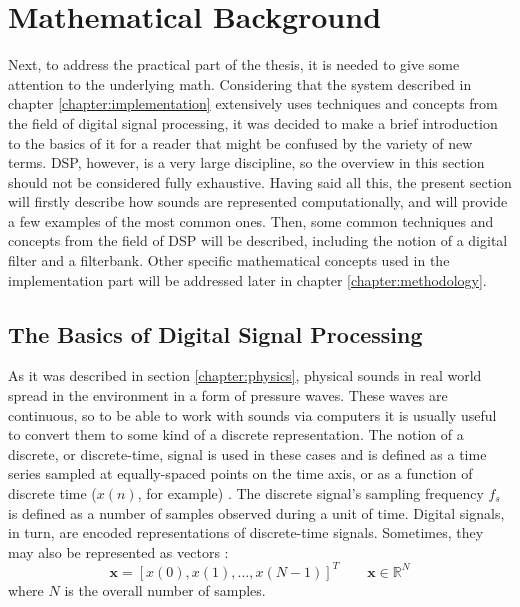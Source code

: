 \section{Mathematical Background}\label{chapter:math}

Next, to address the practical part of the thesis, it is needed to give some attention to the underlying math. Considering that the system described in chapter \ref{chapter:implementation} extensively uses techniques and concepts from the field of digital signal processing, it was decided to make a brief introduction to the basics of it for a reader that might be confused by the variety of new terms. DSP, however, is a very large discipline, so the overview in this section should not be considered fully exhaustive. Having said all this, the present section will firstly describe how sounds are represented computationally, and will provide a few examples of the most common ones. Then, some common techniques and concepts from the field of DSP will be described, including the notion of a digital filter and a filterbank. Other specific mathematical concepts used in the implementation part will be addressed later in chapter \ref{chapter:methodology}.

\subsection{The Basics of Digital Signal Processing}\label{section:math_basics}

As it was described in section \ref{chapter:physics}, physical sounds in real world spread in the environment in a form of pressure waves. These waves are continuous, so to be able to work with sounds via computers it is usually useful to convert them to some kind of a discrete representation. The notion of a discrete, or discrete-time, signal is used in these cases and is defined as a time series sampled at equally-spaced points on the time axis, or as a function of discrete time ($x(n)$, for example) \cite{Shenoi2005}. The discrete signal's sampling frequency $f_s$ is defined as a number of samples observed during a unit of time. Digital signals, in turn, are encoded representations of discrete-time signals. Sometimes, they may also be represented as vectors \cite{Abood2020}: \begin{equation}
	\textbf{x} = [x(0), x(1), \dots{}, x(N - 1)]^T\qquad\textbf{x}\in\mathbb{R}^N
\end{equation}
where $N$ is the overall number of samples.\\

